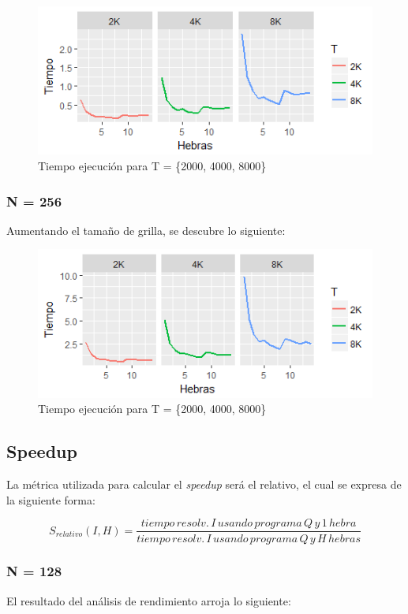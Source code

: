 \documentclass[jou]{apa6}
\begin{document}
\begin{figure}[h]
	\includegraphics[width=\columnwidth]{tiempo-128px.png}
	\caption{Tiempo ejecución para T = \{2000, 4000, 8000\}}
	\label{fig:Figure1}
\end{figure}

\subsubsection{N = 256}
Aumentando el tamaño de grilla, se descubre lo siguiente:

\begin{figure}[h]
	\includegraphics[width=\columnwidth]{tiempo-256px.png}
	\caption{Tiempo ejecución para T = \{2000, 4000, 8000\}}
	\label{fig:Figure2}
\end{figure}

\subsection{Speedup}
La métrica utilizada para calcular el \textit{speedup} será el relativo, el cual se expresa de la siguiente forma:

\[
	S_{relativo}(I, H) = \frac{tiempo\, resolv.\, I\, usando\, programa\, Q\, y\, 1\, hebra}{tiempo\, resolv.\, I\, usando\, programa\, Q\, y\, H\, hebras}
\]

\subsubsection{N = 128}
El resultado del análisis de rendimiento arroja lo siguiente:
\end{document}
